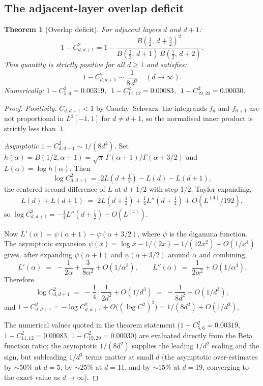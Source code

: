 \documentclass[11pt,a4paper]{article}
\newtheorem{theorem}{Theorem}[section]
\begin{document}
\subsection{The adjacent-layer overlap deficit}

\begin{theorem}[Overlap deficit]\label{thm:overlap}
For adjacent layers $d$ and $d+1$:
\[
1 - C_{d,d+1}^2 = 1 - \frac{B\!\left(\frac{1}{2},\, d + \frac{3}{2}\right)^2}{B\!\left(\frac{1}{2},\, d+1\right)\, B\!\left(\frac{1}{2},\, d+2\right)}.
\]
This quantity is strictly positive for all $d \geq 1$ and satisfies:
\[
1 - C_{d,d+1}^2 \sim \frac{1}{8\, d^2} \quad (d \to \infty).
\]
Numerically: $1 - C_{5,6}^2 = 0.00319$, $\; 1 - C_{11,12}^2 = 0.00083$, $\; 1 - C_{19,20}^2 = 0.00030$.
\end{theorem}

\begin{proof}
\emph{Positivity.} $C_{d,d+1} < 1$ by Cauchy--Schwarz: the integrands $f_d$ and $f_{d+1}$ are not proportional in $L^2[-1,1]$ for $d \neq d+1$, so the normalised inner product is strictly less than~$1$.

\emph{Asymptotic $1 - C_{d,d+1}^2 \sim 1/(8d^2)$.} Set $h(\alpha) = B(1/2,\alpha+1) = \sqrt{\pi}\,\Gamma(\alpha+1)/\Gamma(\alpha+3/2)$ and $L(\alpha) = \log h(\alpha)$. Then
\[
\log C_{d,d+1}^2 \;=\; 2L(d+\tfrac{1}{2}) - L(d) - L(d+1),
\]
the centered second difference of $L$ at $d+1/2$ with step $1/2$. Taylor expanding,
\[
L(d) + L(d+1) \;=\; 2L(d+\tfrac{1}{2}) + \tfrac{1}{4}L''(d+\tfrac{1}{2}) + O(L^{(4)}/192),
\]
so $\log C_{d,d+1}^2 = -\tfrac{1}{4}L''(d+\tfrac{1}{2}) + O(L^{(4)})$.

Now $L'(\alpha) = \psi(\alpha+1) - \psi(\alpha+3/2)$, where $\psi$ is the digamma function. The asymptotic expansion $\psi(x) = \log x - 1/(2x) - 1/(12x^2) + O(1/x^4)$ gives, after expanding $\psi(\alpha+1)$ and $\psi(\alpha+3/2)$ around $\alpha$ and combining,
\[
L'(\alpha) \;=\; -\frac{1}{2\alpha} + \frac{3}{8\alpha^2} + O(1/\alpha^3),
\qquad
L''(\alpha) \;=\; \frac{1}{2\alpha^2} + O(1/\alpha^3).
\]
Therefore
\[
\log C_{d,d+1}^2 \;=\; -\frac{1}{4}\cdot\frac{1}{2d^2} + O(1/d^3) \;=\; -\frac{1}{8d^2} + O(1/d^3),
\]
and $1 - C_{d,d+1}^2 = -\log C_{d,d+1}^2 + O\bigl((\log C^2)^2\bigr) = 1/(8d^2) + O(1/d^3)$.

The numerical values quoted in the theorem statement ($1 - C_{5,6}^2 = 0.00319$, $1 - C_{11,12}^2 = 0.00083$, $1 - C_{19,20}^2 = 0.00030$) are evaluated directly from the Beta function ratio; the asymptotic $1/(8d^2)$ supplies the leading $1/d^2$ scaling and the sign, but subleading $1/d^3$ terms matter at small $d$ (the asymptotic over-estimates by $\sim 50\%$ at $d=5$, by $\sim 25\%$ at $d=11$, and by $\sim 15\%$ at $d=19$, converging to the exact value as $d\to\infty$).
\end{proof}
\end{document}
